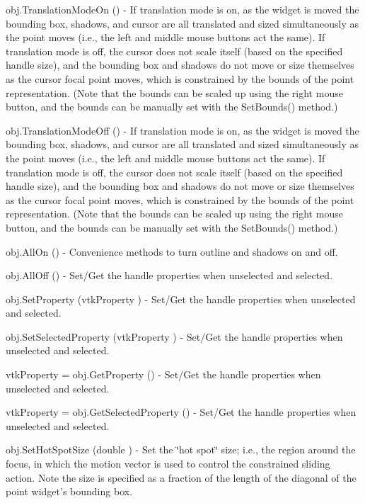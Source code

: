 \begin{DoxyItemize}
\item {\ttfamily obj.\-Translation\-Mode\-On ()} -\/ If translation mode is on, as the widget is moved the bounding box, shadows, and cursor are all translated and sized simultaneously as the point moves (i.\-e., the left and middle mouse buttons act the same). If translation mode is off, the cursor does not scale itself (based on the specified handle size), and the bounding box and shadows do not move or size themselves as the cursor focal point moves, which is constrained by the bounds of the point representation. (Note that the bounds can be scaled up using the right mouse button, and the bounds can be manually set with the Set\-Bounds() method.)  
\item {\ttfamily obj.\-Translation\-Mode\-Off ()} -\/ If translation mode is on, as the widget is moved the bounding box, shadows, and cursor are all translated and sized simultaneously as the point moves (i.\-e., the left and middle mouse buttons act the same). If translation mode is off, the cursor does not scale itself (based on the specified handle size), and the bounding box and shadows do not move or size themselves as the cursor focal point moves, which is constrained by the bounds of the point representation. (Note that the bounds can be scaled up using the right mouse button, and the bounds can be manually set with the Set\-Bounds() method.)  
\item {\ttfamily obj.\-All\-On ()} -\/ Convenience methods to turn outline and shadows on and off.  
\item {\ttfamily obj.\-All\-Off ()} -\/ Set/\-Get the handle properties when unselected and selected.  
\item {\ttfamily obj.\-Set\-Property (vtk\-Property )} -\/ Set/\-Get the handle properties when unselected and selected.  
\item {\ttfamily obj.\-Set\-Selected\-Property (vtk\-Property )} -\/ Set/\-Get the handle properties when unselected and selected.  
\item {\ttfamily vtk\-Property = obj.\-Get\-Property ()} -\/ Set/\-Get the handle properties when unselected and selected.  
\item {\ttfamily vtk\-Property = obj.\-Get\-Selected\-Property ()} -\/ Set/\-Get the handle properties when unselected and selected.  
\item {\ttfamily obj.\-Set\-Hot\-Spot\-Size (double )} -\/ Set the \char`\"{}hot spot\char`\"{} size; i.\-e., the region around the focus, in which the motion vector is used to control the constrained sliding action. Note the size is specified as a fraction of the length of the diagonal of the point widget's bounding box.  

\end{DoxyItemize}
